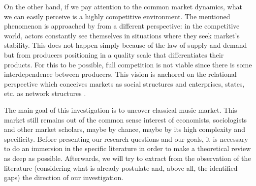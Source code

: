 \documentclass[a4paper, 12pt, openright, oneside, german, french, brazil, english, article]{abntex2}
\begin{document}
	On the other hand, if we pay attention to the common market dynamics, what we can easily perceive is a highly competitive environment. The mentioned phenomenon is approached by  from a different perspective: in the competitive world, actors constantly see themselves in situations where they seek market's stability. This does not happen simply because of the law of supply and demand but from producers positioning in a quality scale that differentiates their products. For this to be possible, full competition is not viable since there is some interdependence between producers. This vision is anchored on the relational perspective which conceives markets as social structures and enterprises, states, etc. as network structures \cite{white2008,white2002markets,lazega2014redes}.


	
	The main goal of this investigation is to uncover classical music market. This market still remains out of the common sense interest of economists, sociologists and other market scholars, maybe by chance, maybe by its high complexity and specificity. Before presenting our research questions and our goals, it is necessary to do an immersion in the specific literature in order to make a theoretical review as deep as possible. Afterwards, we will try to extract from the observation of the literature (considering what is already postulate and, above all, the identified gaps) the direction of our investigation.
\end{document}
